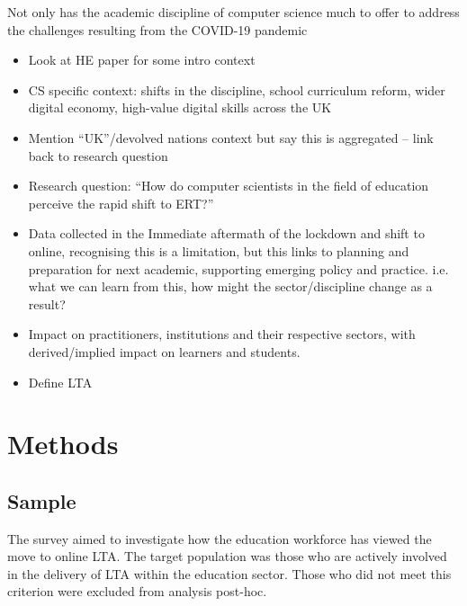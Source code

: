 \documentclass[sigconf]{acmart}
\begin{document}
Not only has the academic discipline of computer science much to offer
to address the challenges resulting from the COVID-19 pandemic


\begin{itemize}
\item Look at HE paper for some intro context
\item CS specific context: shifts in the discipline, school curriculum
reform, wider digital economy, high-value digital skills across the UK
\item Mention “UK”/devolved nations context but say this is aggregated
– link back to research question
\item Research question: “How do computer scientists in the field of
education perceive the rapid shift to ERT?”
\item Data collected in the Immediate aftermath of the lockdown and
shift to online, recognising this is a limitation, but this links to
planning and preparation for next academic, supporting emerging policy
and practice. i.e. what we can learn from this, how might the
sector/discipline change as a result?
\item Impact on practitioners, institutions and their respective
sectors, with derived/implied impact on learners and students.
\item Define LTA
\end{itemize}

\section{Methods}\label{methods}

\subsection{Sample}

The survey aimed to investigate how the education workforce has viewed
the move to online LTA. The target population was those who are
actively involved in the delivery of LTA within the education
sector. Those who did not meet this criterion were excluded from
analysis post-hoc.
\end{document}
